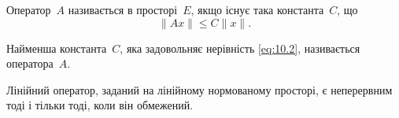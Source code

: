 \begin{definition}
Оператор~$A$ називається  в
просторі~$E$, якщо існує така константа~$C$, що 
\begin{equation}
    \label{eq:10.2}
    \|A x\| \le C \|x\|.
\end{equation}
\end{definition}

\begin{definition}
Найменша константа~$C$,
яка задовольняє нерівність \eqref{eq:10.2},
називається  оператора~$A$.
\end{definition}

\begin{theorem}
Лінійний оператор, заданий на лінійному
нормованому просторі, є неперервним тоді і тільки тоді,
коли він обмежений.
\end{theorem}

